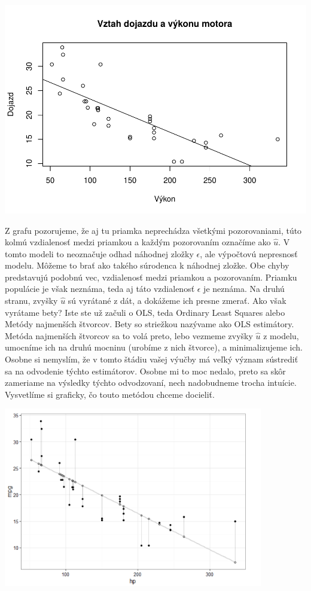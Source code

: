 \includegraphics{test_files/figure-latex/unnamed-chunk-41-1.pdf}

Z grafu pozorujeme, že aj tu priamka neprechádza všetkými pozorovaniami,
túto kolmú vzdialenosť medzi priamkou a každým pozorovaním označíme ako
\(\hat{u}\). V tomto modeli to neoznačuje odhad náhodnej zložky
\(\epsilon\), ale výpočtovú nepresnosť modelu. Môžeme to brať ako takého
súrodenca k náhodnej zložke. Obe chyby predstavujú podobnú vec,
vzdialenosť medzi priamkou a pozorovaním. Priamku populácie je však
neznáma, teda aj táto vzdialenosť \(\epsilon\) je neznáma. Na druhú
stranu, zvyšky \(\hat{u}\) sú vyrátané z dát, a dokážeme ich presne
zmerať. Ako však vyrátame bety? Iste ste už začuli o OLS, teda Ordinary
Least Squares alebo Metódy najmenších štvorcov. Bety so striežkou
nazývame ako OLS estimátory. Metóda najmenších štvorcov sa to volá
preto, lebo vezmeme zvyšky \(\hat{u}\) z modelu, umocníme ich na druhú
mocninu (urobíme z nich štvorce), a minimalizujeme ich. Osobne si
nemyslím, že v tomto štádiu vašej výučby má veľký význam sústrediť sa na
odvodenie týchto estimátorov. Osobne mi to moc nedalo, preto sa skôr
zameriame na výsledky týchto odvodzovaní, nech nadobudneme trocha
intuície. Vysvetlíme si graficky, čo touto metódou chceme docieliť.

\begin{center}

\includegraphics[width=0.85\textwidth,height=\textheight]{diplomka obrazky/4.png}

\end{center}

